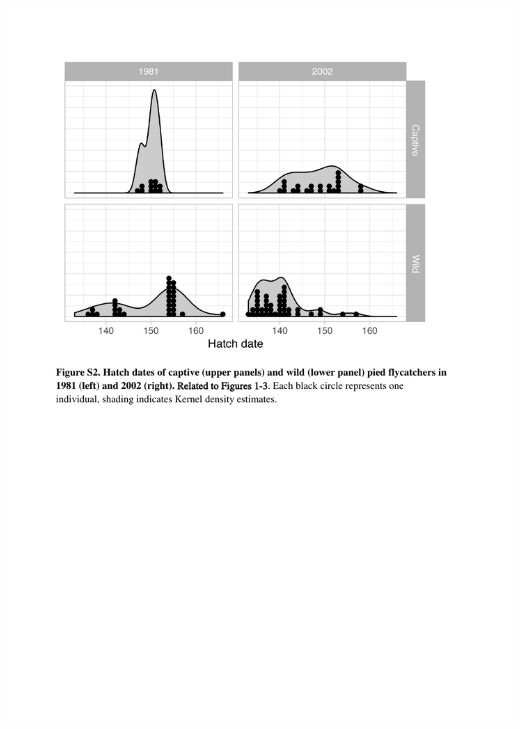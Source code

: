 \documentclass[a4paper, twoside]{templates/ociamthesis}
\begin{document}
\includegraphics[width=1\linewidth]{pdf_chapters/pied/pied_supp_crop_Part3}
\end{document}
